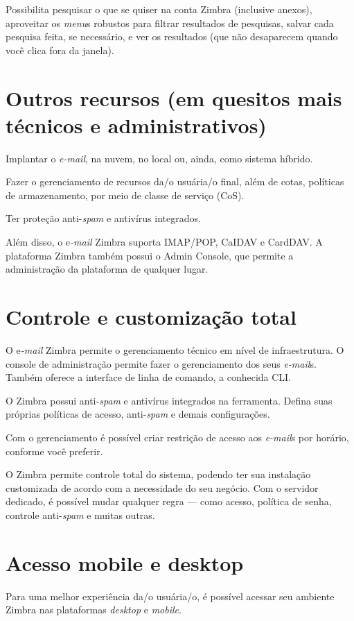 \documentclass[openright, twoside, a4paper]{memoir}
\begin{document}
Possibilita pesquisar o que se quiser na conta Zimbra (inclusive
anexos), aproveitar os \emph{menu}s robustos para filtrar resultados de
pesquisas, salvar cada pesquisa feita, se necessário, e ver os
resultados (que não desaparecem quando você clica fora da janela).

\section{Outros recursos (em quesitos mais técnicos e
administrativos)}

Implantar o \emph{e-mail}, na nuvem, no local ou, ainda, como sistema
híbrido.

Fazer o gerenciamento de recursos da/o usuária/o final, além de cotas,
políticas de armazenamento, por meio de classe de serviço (CoS).

Ter proteção anti-\emph{spam} e antivírus integrados.

Além disso, o e\emph{-mail} Zimbra suporta IMAP/POP, CaIDAV e CardDAV. A
plataforma Zimbra também possui o Admin Console, que permite a
administração da plataforma de qualquer lugar.

\section{Controle e customização
total}

O e\emph{-mail} Zimbra permite o gerenciamento técnico em nível de
infraestrutura. O console de administração permite fazer o gerenciamento
dos seus \emph{e-mail}s. Também oferece a interface de linha de comando,
a conhecida CLI.

O Zimbra possui anti-\emph{spam} e antivírus integrados na ferramenta.
Defina suas próprias políticas de acesso, anti-\emph{spam} e demais
configurações.

Com o gerenciamento é possível criar restrição de acesso aos
\emph{e-mail}s por horário, conforme você preferir.

O Zimbra permite controle total do sistema, podendo ter sua instalação
customizada de acordo com a necessidade do seu negócio. Com o servidor
dedicado, é possível mudar qualquer regra --- como acesso, política de
senha, controle anti-\emph{spam} e muitas outras.

\section{Acesso mobile e desktop}

Para uma melhor experiência da/o usuária/o, é possível acessar seu
ambiente Zimbra nas plataformas \emph{desktop} e \emph{mobile}.
\end{document}

